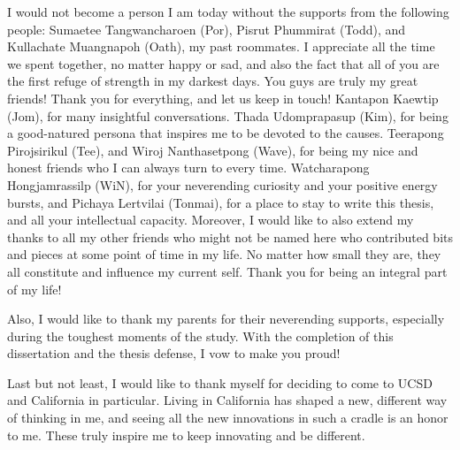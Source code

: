 \begin{spacing}{2.0}
    I would not become a person I am today without the supports from the following people:
        Sumaetee Tangwancharoen (Por),
        Pisrut Phummirat (Todd), and
        Kullachate Muangnapoh (Oath),
            my past roommates. I appreciate all the time we spent together, no matter happy or sad, and also the fact that all of you
            are the first refuge of strength in my darkest days. You guys are truly my great friends! Thank you for everything,
            and let us keep in touch!
        Kantapon Kaewtip (Jom),
            for many insightful conversations.
        Thada Udomprapasup (Kim),
            for being a good-natured persona that inspires me to be devoted to the causes.
        Teerapong Pirojsirikul (Tee), and
        Wiroj Nanthasetpong (Wave),
            for being my nice and honest friends who I can always turn to every time.
        Watcharapong Hongjamrassilp (WiN),
            for your neverending curiosity and your positive energy bursts, and
        Pichaya Lertvilai (Tonmai),
            for a place to stay to write this thesis, and all your intellectual capacity.
    Moreover, I would like to also extend my thanks to all my other friends who might not be named here who contributed bits and pieces
    at some point of time in my life. No matter how small they are, they all constitute and influence my current self. Thank you
    for being an integral part of my life!

Also, I would like to thank my parents for their neverending supports, especially during the toughest moments of the study. With the 
completion of this dissertation and the thesis defense, I vow to make you proud!

Last but not least, I would like to thank myself for deciding to come to UCSD and California in particular. Living in California
has shaped a new, different way of thinking in me, and seeing all the new innovations in such a cradle is an honor to me. These
truly inspire me to keep innovating and be different.
\end{spacing}
